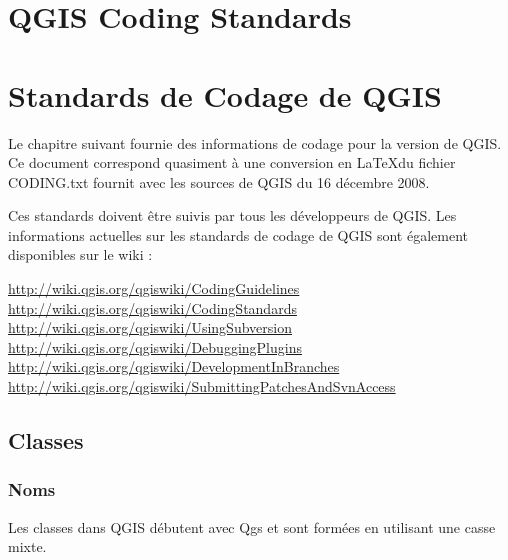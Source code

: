 
\section{QGIS Coding Standards}
\section{Standards de Codage de QGIS}


Le chapitre suivant fournie des informations de codage pour la version \CURRENT de QGIS.
Ce document correspond quasiment \`a une conversion en \LaTeX du fichier CODING.txt fournit 
avec les sources de QGIS du 16 d\'ecembre 2008.

Ces standards doivent \^etre suivis par tous les d\'eveloppeurs de QGIS. Les informations actuelles
sur les standards de codage de QGIS sont \'egalement disponibles sur le wiki :

\url{http://wiki.qgis.org/qgiswiki/CodingGuidelines} \\
\url{http://wiki.qgis.org/qgiswiki/CodingStandards} \\
\url{http://wiki.qgis.org/qgiswiki/UsingSubversion} \\
\url{http://wiki.qgis.org/qgiswiki/DebuggingPlugins} \\
\url{http://wiki.qgis.org/qgiswiki/DevelopmentInBranches} \\
\url{http://wiki.qgis.org/qgiswiki/SubmittingPatchesAndSvnAccess} \\

\subsection{Classes}
\subsubsection{Noms}
Les classes dans QGIS d\'ebutent avec Qgs et sont form\'ees en utilisant une casse mixte.

